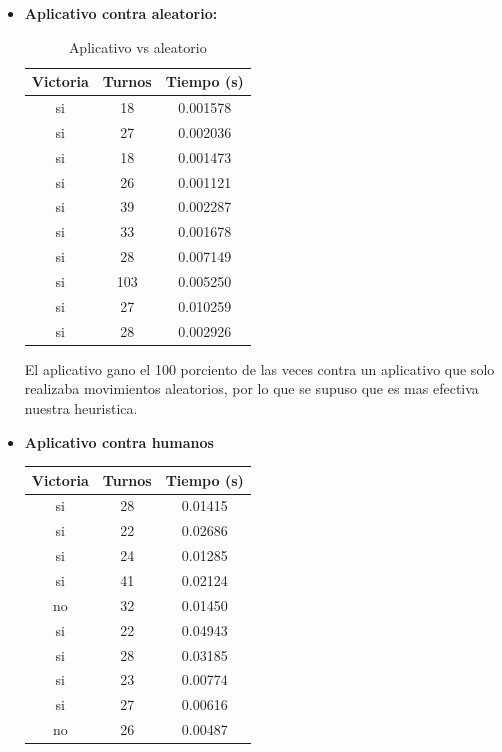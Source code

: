 \documentclass[12pt]{article}
\begin{document}
    \begin{itemize}
        \item\textbf{Aplicativo contra aleatorio:}
        
                 \begin{table}[H]
                \centering
                \begin{tabular}{|c|c|c|}\hline
                \textbf{Victoria} & \textbf{Turnos} & \textbf{Tiempo (s)}\\\hline
                    si & 18 & 0.001578 \\ \hline
                    si & 27 & 0.002036 \\ \hline                 
                    si & 18 & 0.001473 \\ \hline
                    si & 26 & 0.001121 \\ \hline               
                    si & 39 & 0.002287 \\ \hline
                    si & 33 & 0.001678 \\ \hline
                    si & 28 & 0.007149\\ \hline
                    si & 103 & 0.005250 \\ \hline
                    si & 27 & 0.010259 \\ \hline
                    si & 28 & 0.002926 \\ \hline
                \end{tabular}
                \caption{Aplicativo vs aleatorio}
                \label{tab3}
            \end{table}
            
            El aplicativo gano el 100 porciento de las veces contra un aplicativo que solo realizaba movimientos aleatorios, por lo que se supuso que es mas efectiva nuestra heuristica.
        
        
        \item\textbf{Aplicativo contra humanos}
            \begin{table}[H]
                \centering
                \begin{tabular}{|c|c|c|}\hline
                \textbf{Victoria} & \textbf{Turnos} & \textbf{Tiempo (s)}\\\hline
                    si & 28 & 0.01415 \\ \hline
                    si & 22 & 0.02686 \\ \hline                 
                    si & 24 & 0.01285 \\ \hline
                    si & 41 & 0.02124 \\ \hline               
                    no & 32 & 0.01450 \\ \hline
                    si & 22 & 0.04943 \\ \hline
                    si & 28 & 0.03185 \\ \hline
                    si & 23 & 0.00774 \\ \hline
                    si & 27 & 0.00616 \\ \hline
                    no & 26 & 0.00487 \\ \hline
                    

\end{tabular}
\end{table}
\end{itemize}
\end{document}
